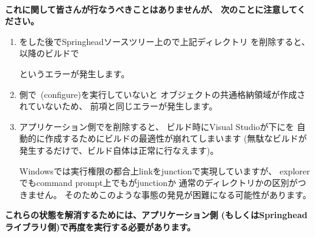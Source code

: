 \begin{narrow}[20pt]
	\thinrule{\linewidth}\\
	{\bf{\KLUDGE これに関して皆さんが行なうべきことはありませんが、
	\KLUDGE 次のことに注意してください。}}

	\medskip
	\begin{enumerate}
	  \item	\cmake \KLUDGE をした後でSpringhead\KLUDGE ソースツリー上ので上記ディレクトリ
		\KLUDGE を削除すると、以降のビルドで\\
		\hspace{15pt}

		\KLUDGE というエラーが発生します。

	  \item	\SprLib \KLUDGE 側で\cmake\ (configure)\KLUDGE を実行していないと
		\KLUDGE オブジェクトの共通格納領域が作成されていないため、
		\KLUDGE 前項と同じエラーが発生します。

	  \item	\KLUDGE アプリケーション側で\KLUDGE を削除すると、
		\KLUDGE ビルド時にVisual Studio\KLUDGE が\build \KLUDGE 下に\KLUDGE を
		\KLUDGE 自動的に作成するためにビルドの最適性が崩れてしまいます
		(\KLUDGE 無駄なビルドが発生するだけで、ビルド自体は正常に行なえます)\KLUDGE 。
		\begin{narrow}[s][15pt]
		Windows\KLUDGE では実行権限の都合上link\KLUDGE をjunction\KLUDGE で実現していますが、
		explorer\KLUDGE でもcommand prompt\KLUDGE 上でも\KLUDGE がjunction\KLUDGE か
		\KLUDGE 通常のディレクトリかの区別がつきません。
		\KLUDGE そのためこのような事態の発見が困難になる可能性があります。
		\end{narrow}
	\end{enumerate}
	\medskip
	{\bf{\KLUDGE これらの状態を解消するためには、アプリケーション側
	(\KLUDGE もしくはSpringhead\KLUDGE ライブラリ側)\KLUDGE で再度\cmake \KLUDGE を実行する必要があります。}}

	\thinrule{\linewidth}
\end{narrow}


